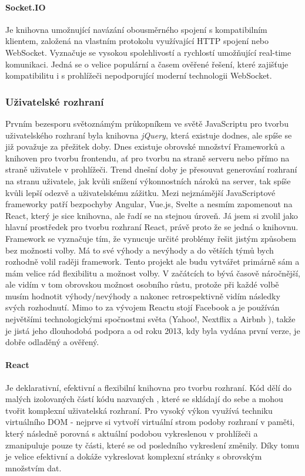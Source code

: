 \paragraph{Socket.IO}\label{socketio} Je knihovna umožnující navázání obousměrného spojení s kompatibilním klientem, založená na vlastním protokolu využívající HTTP spojení nebo WebSocket. Vyznačuje se vysokou spolehlivostí a rychlostí umožňující real-time komunikaci. Jedná se o velice populární a časem ověřené řešení, které zajišťuje kompatibilitu i s prohlížeči nepodporující moderní technologii WebSocket.


\subsubsection{Uživatelské rozhraní}
Prvním bezesporu světoznámým průkopníkem ve světě JavaScriptu pro tvorbu uživatelského rozhraní byla knihovna \textit{jQuery}, která existuje dodnes, ale spíše se již považuje za přežitek doby. Dnes existuje obrovské množství Frameworků a knihoven pro tvorbu frontendu, ať pro tvorbu na straně serveru nebo přímo na straně uživatele v prohlížeči. Trend dnešní doby je přesouvat generování rozhraní na stranu uživatele, jak kvůli snížení výkonnostních nároků na server, tak spíše kvůli lepší odezvě a uživatelskému zážitku. Mezi nejznámější JavaScriptové frameworky patří bezpochyby Angular, Vue.js, Svelte a nesmím zapomenout na React, který je sice knihovna, ale řadí se na stejnou úroveň. Já jsem si zvolil jako hlavní prostředek pro tvorbu rozhraní React, právě proto že se jedná o knihovnu. Framework se vyznačuje tím, že vynucuje určité problémy řešit jistým způsobem bez možnosti volby. Má to své výhody a nevýhody a do větších týmů bych rozhodně volil raději framework. Tento projekt ale budu vytvářet primárně sám a mám velice rád flexibilitu a možnost volby. V začátcích to bývá časově náročnější, ale vidím v tom obrovskou možnost osobního růstu, protože při každé volbě musím hodnotit výhody/nevýhody a nakonec retrospektivně vidím následky svých rozhodnutí. Mimo to za vývojem Reactu stojí Facebook a je používán největšími technologickými spočnostmi světa (Yahoo!, Nextflix a Airbnb \cite{react-companies}), takže je jistá jeho dlouhodobá podpora a od roku 2013, kdy byla vydána první verze, je dobře odladěný a ověřený.

\paragraph{React} Je deklarativní, efektivní a flexibilní knihovna pro tvorbu rozhraní. Kód dělí do malých izolovaných částí kódu nazvaných , které se skládají do sebe a mohou tvořit komplexní uživatelská rozhraní. Pro vysoký výkon využívá techniku virtuálního DOM - nejprve si vytvoří virtuální strom podoby rozhraní v paměti, který následně porovná s aktuální podobou vykreslenou v prohlížeči a zmanipuluje pouze ty části, které se od posledního vykreslení změnily. Díky tomu je velice efektivní a dokáže vykreslovat komplexní stránky s obrovským množstvím dat. \cite{react}